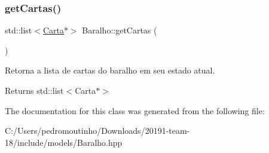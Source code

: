 \subsubsection{\texorpdfstring{getCartas()}{getCartas()}}
{\footnotesize\ttfamily std\+::list$<$\mbox{\hyperlink{class_carta}{Carta}}$\ast$$>$ Baralho\+::get\+Cartas (\begin{DoxyParamCaption}{ }\end{DoxyParamCaption})}



Retorna a lista de cartas do baralho em seu estado atual. 

\begin{DoxyReturn}{Returns}
std\+::list$<$\+Carta$\ast$$>$ 
\end{DoxyReturn}


The documentation for this class was generated from the following file\+:\begin{DoxyCompactItemize}
\item 
C\+:/\+Users/pedromoutinho/\+Downloads/20191-\/team-\/18/include/models/Baralho.\+hpp\end{DoxyCompactItemize}
